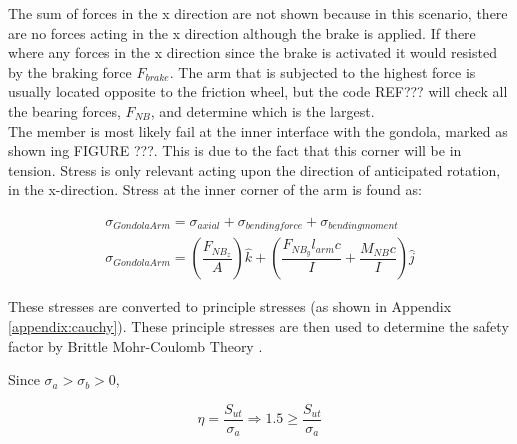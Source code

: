 \documentclass[../main.tex]{subfiles}
\begin{document}
The sum of forces in the x direction are not shown because in this scenario, there are no forces acting in the x direction although the brake is applied. If there where any forces in the x direction since the brake is activated it would resisted by the braking force $F_{brake}$. The arm that is subjected to the highest force is usually located opposite to the friction wheel, but the code REF??? will check all the bearing forces, $F_{NB}$, and determine which is the largest. \\

The member is most likely fail at the inner interface with the gondola, marked as shown ing FIGURE ???. This is due to the fact that this corner will be in tension. Stress is only relevant acting upon the direction of anticipated rotation, in the x-direction. Stress at the inner corner of the arm is found as:

\begin{align}
	\sigma _{Gondola Arm} = \sigma _{axial} + \sigma _{bending force} + \sigma _{bending moment} \\ \label{armStress}
	\sigma _{Gondola Arm}  = \left(\dfrac{F_{NB_{z}}}{A}\right)\hat{k} + \left(\dfrac{F_{NB_{y}}l_{arm}c}{I}  + \dfrac{M_{NB}c}{I} \right) \hat{j}
\end{align}

These stresses are converted to principle stresses (as shown in Appendix \ref{appendix:cauchy}). These principle stresses are then used to determine the safety factor by Brittle Mohr-Coulomb Theory \cite[227]{shigley}.

Since $\sigma _a > \sigma _b > 0$,

\begin{equation}
	\eta = \dfrac{S_{ut}}{\sigma _a} \Rightarrow 1.5 \geq \dfrac{S_{ut}}{\sigma _a}
\end{equation}
\end{document}
